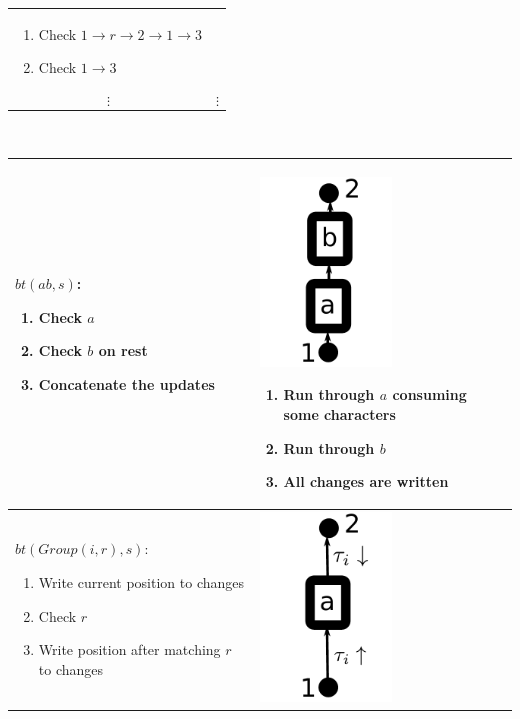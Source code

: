 \documentclass[11pt,a4paper,twoside,openright]{Thesis}
\theoremstyle{definition}
\begin{document}
\begin{center}
\begin{tabular}{p{5cm}|p{7cm}}
    \begin{enumerate}
      \item Check $1\rightarrow r\rightarrow 2\rightarrow 1\rightarrow 3$
      \item Check $1\rightarrow 3$
      \end{enumerate}\\
      $$\vdots$$& $$\vdots$$\\
      \hline
  \end{tabular}
  \\
  \begin{tabular}{p{5cm}|p{7cm}}
    \hline
    $bt(ab, s)$: \begin{enumerate}
      \item Check $a$
      \item Check $b$ on rest
      \item Concatenate the updates
    \end{enumerate}
    & \includegraphics[width=3.5cm]{graphs/rseq}
    \begin{enumerate}
      \item Run through $a$ consuming some characters
      \item Run through $b$
      \item All changes are written
    \end{enumerate} \\
    \hline
    $bt(Group(i, r), s)$: \begin{enumerate}
      \item Write current position to changes
      \item Check $r$
      \item Write position after matching $r$ to changes
    \end{enumerate}
    & \includegraphics[width=3.5cm]{graphs/rgroup}

\end{tabular}
\end{center}
\end{document}
